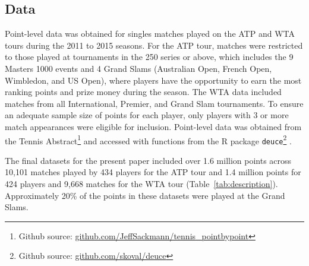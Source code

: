 \documentclass{Latex/svjour3}
\begin{document}
\subsection{Data}

Point-level data was obtained for singles matches played on the ATP
and WTA tours during the 2011 to 2015 seasons. For the ATP tour, matches
were restricted to those played at tournaments in the 250 series or above, which
includes the 9 Masters 1000 events and 4 Grand Slams (Australian Open,
French Open, Wimbledon, and US Open),
where players have the opportunity to earn the most ranking points and
prize money during the season. The WTA data included matches from all
International, Premier, and Grand Slam tournaments. To ensure an
adequate sample size of points for each player, only players with 3 or
more match appearances were eligible for inclusion. Point-level data
was obtained from the Tennis Abstract\footnote{Github source: \url{github.com/JeffSackmann/tennis_pointbypoint}} and accessed with functions from
the R package \texttt{deuce}\footnote{Github source: \url{github.com/skoval/deuce}} .

The final datasets for the present paper included over 1.6 million
points across 10,101 matches played by 434 players for the ATP tour
and 1.4 million points for 424 players and 9,668 matches
for the WTA tour (Table~\ref{tab:description}). Approximately 20\% of
the points in these datasets were played at the Grand Slams. 
\end{document}
